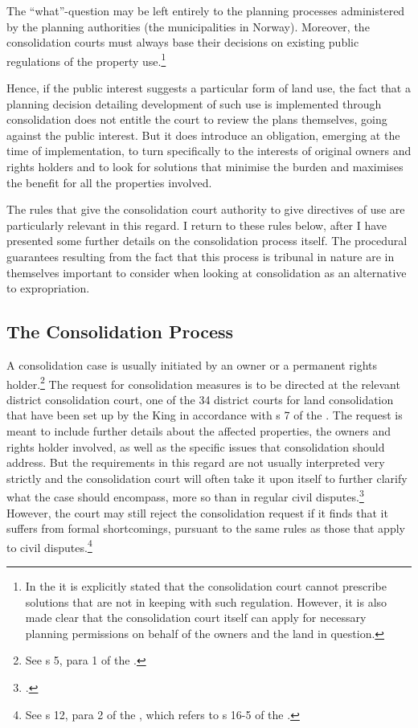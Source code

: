 The ``what''-question may be left entirely to the planning processes administered by the planning authorities (the municipalities in Norway). Moreover, the consolidation courts must always base their decisions on existing public regulations of the property use.\footnote{In the \cite[3-17]{lca13} it is explicitly stated that the consolidation court cannot prescribe solutions that are not in keeping with such regulation. However, it is also made clear that the consolidation court itself can apply for necessary planning permissions on behalf of the owners and the land in question.}

Hence, if the public interest suggests a particular form of land use, the fact that a planning decision detailing development of such use is implemented through consolidation does not entitle the court to review the plans themselves, going against the public interest. But it does introduce an obligation, emerging at the time of implementation, to turn specifically to the interests of original owners and rights holders and to look for solutions that minimise the burden and maximises the benefit for all the properties involved.

The rules that give the consolidation court authority to give directives of use are particularly relevant in this regard. I return to these rules below, after I have presented some further details on the consolidation process itself. The procedural guarantees resulting from the fact that this process is tribunal in nature are in themselves important to consider when looking at consolidation as an alternative to expropriation.

\subsection{The Consolidation Process}\label{subsec:lcp}

A consolidation case is usually initiated by an owner or a permanent rights holder.\footnote{See s 5, para 1 of the \cite{lca79}.} The request for consolidation measures is to be directed at the relevant district consolidation court, one of the 34 district courts for land consolidation that have been set up by the King in accordance with s 7 of the \cite{lca79}. The request is meant to include further details about the affected properties, the owners and rights holder involved, as well as the specific issues that consolidation should address. But the requirements in this regard are not usually interpreted very strictly and the consolidation court will often take it upon itself to further clarify what the case should encompass, more so than in regular civil disputes.\footcite[39]{langbach09} However, the court may still reject the consolidation request if it finds that it suffers from formal shortcomings, pursuant to the same rules as those that apply to civil disputes.\footnote{See s 12, para 2 of the \cite{lca79}, which refers to s 16-5 of the \cite{cda05}.}

